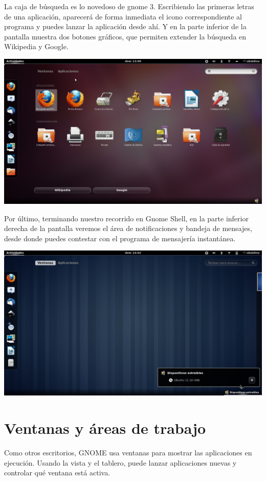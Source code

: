\begin{itemize}
La caja de búsqueda es lo novedoso de gnome 3. Escribiendo las primeras letras de una aplicación, aparecerá de forma inmediata el icono correspondiente al programa y puedes lanzar la aplicación desde ahí. Y en la parte inferior de la pantalla muestra dos botones gráficos, que permiten extender la búsqueda en Wikipedia y Google. 
\begin{center}
\includegraphics[scale=0.3]{img/Pantallazo6.png}
\end{center}
Por último, terminando nuestro recorrido en Gnome Shell, en la parte inferior derecha de la pantalla veremos el área de notificaciones y bandeja de mensajes, desde donde puedes contestar con el programa de mensajería instantánea.
\begin{center}
\includegraphics[scale=0.3]{img/Pantallazo7.png} 
\end{center}
\end{itemize}
\section{Ventanas y áreas de trabajo}
Como otros escritorios, GNOME usa ventanas para mostrar las aplicaciones en ejecución. Usando la vista y el tablero, puede lanzar aplicaciones nuevas y controlar qué ventana está activa.\\


